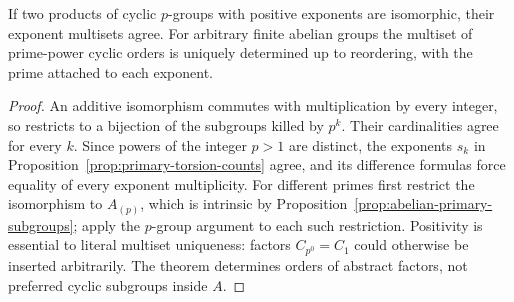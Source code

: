 \begin{theorem}\label{thm:abelian-elementary-uniqueness}
If two products of cyclic $p$-groups with positive exponents are isomorphic, their exponent multisets agree. For arbitrary finite abelian groups the multiset of prime-power cyclic orders is uniquely determined up to reordering, with the prime attached to each exponent.
\end{theorem}
\begin{proof}
An additive isomorphism commutes with multiplication by every integer, so restricts to a bijection of the subgroups killed by $p^k$. Their cardinalities agree for every $k$. Since powers of the integer $p>1$ are distinct, the exponents $s_k$ in Proposition~\ref{prop:primary-torsion-counts} agree, and its difference formulas force equality of every exponent multiplicity. For different primes first restrict the isomorphism to $A_{(p)}$, which is intrinsic by Proposition~\ref{prop:abelian-primary-subgroups}; apply the $p$-group argument to each such restriction. Positivity is essential to literal multiset uniqueness: factors $C_{p^0}=C_1$ could otherwise be inserted arbitrarily. The theorem determines orders of abstract factors, not preferred cyclic subgroups inside $A$.
\end{proof}


